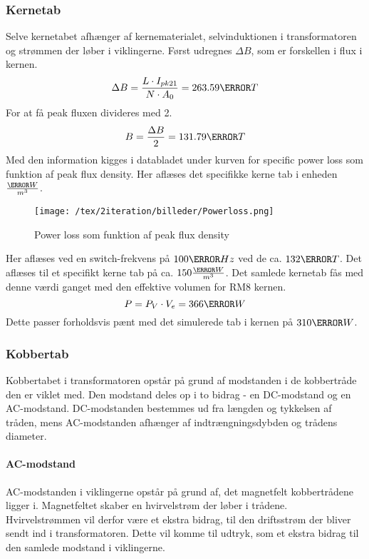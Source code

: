 \subsubsection{Kernetab}
Selve kernetabet afhænger af kernematerialet, selvinduktionen i transformatoren og strømmen der løber i viklingerne. Først udregnes $\Delta B$, som er forskellen i flux i kernen.
\begin{equation} 
\Delta B = \frac{L \cdot I_{pk21}}{N \cdot A_0} = 263.59\milli T
\end{equation}
For at få peak fluxen divideres med 2. 
\begin{equation} \label{B}
B = \frac{\Delta B}{2} = 131.79\milli T
\end{equation}
Med den information kigges i databladet under kurven for specific power loss som funktion af peak flux density. Her aflæses det specifikke kerne tab i enheden $\frac{\kilo W}{m^3}$.
\begin{figure}[H]
	\center
	\texttt{[image: /tex/2iteration/billeder/Powerloss.png]}
	\caption{Power loss som funktion af peak flux density}
	\label{fig: Powerloss}
\end{figure}
\noindent Her aflæses ved en switch-frekvens på $100\kilo Hz$ ved de ca. $132\milli T$. Det aflæses til et specifikt kerne tab på ca. $150\frac{\kilo W}{m^3}$.
Det samlede kernetab fås med denne værdi ganget med den effektive volumen for RM8 kernen.
\begin{equation} \label{DeltaB}
P = P_V \cdot V_e = 366\milli W
\end{equation}
Dette passer forholdsvis pænt med det simulerede tab i kernen på $310\milli W$.

\subsubsection{Kobbertab}
Kobbertabet i transformatoren opstår på grund af modstanden i de kobbertråde den er viklet med. Den modstand deles op i to bidrag - en DC-modstand og en AC-modstand. DC-modstanden bestemmes ud fra længden og tykkelsen af tråden, mens AC-modstanden afhænger af indtrængningsdybden og trådens diameter. 

\paragraph{AC-modstand}
AC-modstanden i viklingerne opstår på grund af, det magnetfelt kobbertrådene ligger i. Magnetfeltet skaber en hvirvelstrøm der løber i trådene. Hvirvelstrømmen vil derfor være et ekstra bidrag, til den driftsstrøm der bliver sendt ind i transformatoren. Dette vil komme til udtryk, som et ekstra bidrag til den samlede modstand i viklingerne. 


